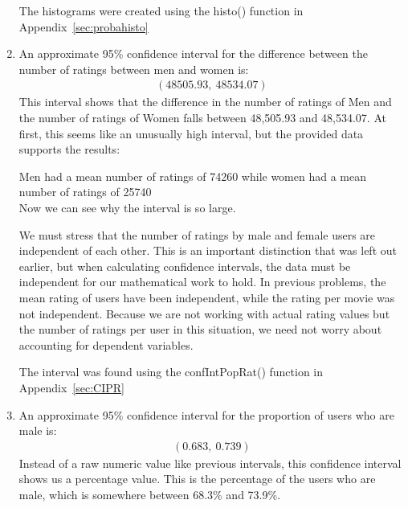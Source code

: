 \documentclass[11pt]{article}  %
\begin{document}
\begin{enumerate}
    
    The histograms were created using the histo() function in Appendix~\ref{sec:probahisto}
    

    \item An approximate 95\% confidence interval for the difference between the number of ratings between men and women is:
    \begin{align*}
        (48505.93,\ 48534.07)
    \end{align*}
    This interval shows that the difference in the number of ratings of Men and the number of ratings of Women falls between 48,505.93 and 48,534.07. At first, this seems like an unusually high interval, but the provided data supports the results:

    Men had a mean number of ratings of 74260 while women had a mean number of ratings of 25740\\

    Now we can see why the interval is so large.
    
    We must stress that the number of ratings by male and female users are independent of each other. This is an important distinction that was left out earlier, but when calculating confidence intervals, the data must be independent for our mathematical work to hold. In previous problems, the mean rating of users have been independent, while the rating per movie was not independent. Because we are not working with actual rating values but the number of ratings per user in this situation, we need not worry about accounting for dependent variables.
    
    The interval was found using the confIntPopRat() function in Appendix~\ref{sec:CIPR}
    
    \item An approximate 95\% confidence interval for the proportion of users who are male is:
    \begin{align*}
         (0.683,\ 0.739)
    \end{align*}
   Instead of a raw numeric value like previous intervals, this confidence interval shows us a percentage value. This is the percentage of the users who are male, which is somewhere between 68.3\% and 73.9\%.
    

\end{enumerate}
\end{document}
